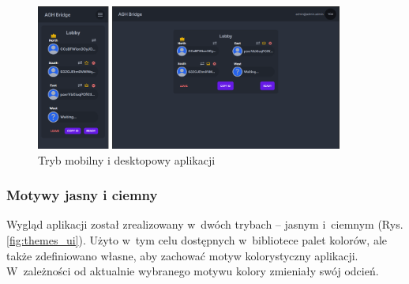 \begin{figure}[h!]
  \centering
  \includegraphics[width=0.9\textwidth]{img/widoki/desktop_mobile.png}
  \caption{Tryb mobilny i desktopowy aplikacji}
  \label{fig:responsive_ui}
\end{figure}

\FloatBarrier

\subsubsection{Motywy jasny i ciemny}

Wygląd aplikacji został zrealizowany w~dwóch trybach --
jasnym i~ciemnym (Rys. \ref{fig:themes_ui}). Użyto w~tym celu dostępnych w~bibliotece
palet kolorów, ale także zdefiniowano własne, aby zachować
motyw kolorystyczny aplikacji. W~zależności od aktualnie
wybranego motywu kolory zmieniały swój odcień.



